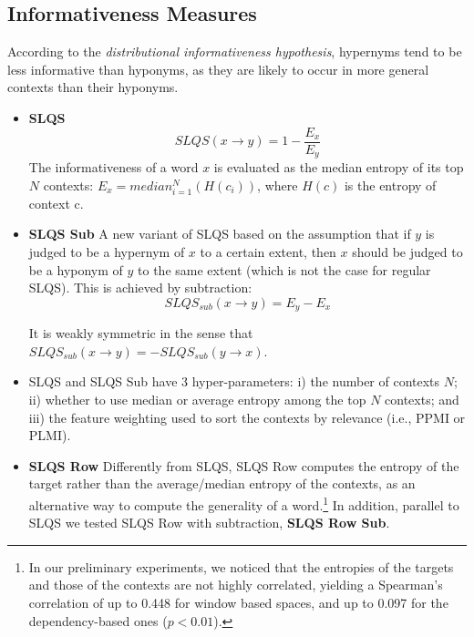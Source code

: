 \documentclass[11pt]{article}
\begin{document}
\subsection{Informativeness Measures}
\label{sec:informativeness_measures}

According to the \emph{distributional informativeness hypothesis}, hypernyms tend to be less informative than hyponyms, as they are likely to occur in more general contexts than their hyponyms.

\begin{itemize}[leftmargin=*]

	\item \textbf{SLQS} \cite{santus2014chasing} 
	\begin{equation*}
	SLQS(x \rightarrow y) = 1 - \frac{E_x}{E_y}
	\end{equation*}
	The informativeness of a word $x$ is evaluated as the median entropy of its top $N$ contexts: $E_x = median_{i=1}^N(H(c_i))$, where $H(c)$ is the entropy of context c. 
	
	\item \textbf{SLQS Sub} A new variant of SLQS based on the assumption that if $y$ is judged to be a hypernym of $x$ to a certain extent, then $x$ should be judged to be a hyponym of $y$ to the same extent (which is not the case for regular SLQS). This is achieved by subtraction: 
	\begin{equation*}
	SLQS_{sub}(x \rightarrow y) = E_y - E_x
	\end{equation*}
	
	\noindent It is weakly symmetric in the sense that $SLQS_{sub}(x \rightarrow y) = - SLQS_{sub}(y \rightarrow x)$.
	
	\item[] SLQS and SLQS Sub have 3 hyper-parameters: i) the number of contexts $N$; ii) whether to use median or average entropy among the top $N$ contexts;
	and iii) the feature weighting used to sort the contexts by relevance (i.e., PPMI or PLMI).
	
	\item \textbf{SLQS Row} Differently from SLQS, SLQS Row computes the entropy of the target rather than the average/median entropy of the contexts, as an alternative way to compute the generality of a word.\footnote{In our preliminary experiments, we noticed that the entropies of the targets and those of the contexts are not highly correlated, yielding a Spearman's correlation of up to 0.448 for window based spaces, and up to 0.097 for the dependency-based ones ($p<0.01$).} In addition, parallel to SLQS we tested SLQS Row with subtraction, \textbf{SLQS Row Sub}.
	

\end{itemize}
\end{document}
